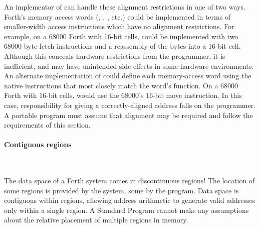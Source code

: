 An implementor of  can handle these alignment restrictions
in one of two ways. Forth's memory access words (, \word{!},
\word{+!}, etc.) could be implemented in terms of smaller-width access
instructions which have no alignment restrictions. For example, on a
68000 Forth with 16-bit cells,  could be implemented with two
68000 byte-fetch instructions and a reassembly of the bytes into a
16-bit cell. Although this conceals hardware restrictions from the
programmer, it is inefficient, and may have unintended side effects
in some hardware environments. An alternate implementation of 
could define each memory-access word using the native instructions
that most closely match the word's function. On a 68000 Forth with
16-bit cells,  would use the 68000's 16-bit move instruction.
In this case, responsibility for giving  a correctly-aligned
address falls on the programmer. A portable  program must
assume that alignment may be required and follow the requirements of
this section.

\paragraph{Contiguous regions} ~ %

The data space of a Forth system comes in discontinuous regions! The
location of some regions is provided by the system, some by the
program. Data space is contiguous within regions, allowing address
arithmetic to generate valid addresses only within a single region.
A Standard Program cannot make any assumptions about the relative
placement of multiple regions in memory.

